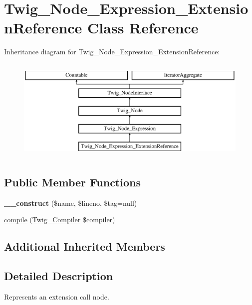 \hypertarget{class_twig___node___expression___extension_reference}{}\section{Twig\+\_\+\+Node\+\_\+\+Expression\+\_\+\+Extension\+Reference Class Reference}
\label{class_twig___node___expression___extension_reference}
Inheritance diagram for Twig\+\_\+\+Node\+\_\+\+Expression\+\_\+\+Extension\+Reference\+:\begin{figure}[H]
\begin{center}
\leavevmode
\includegraphics[height=5.000000cm]{class_twig___node___expression___extension_reference}
\end{center}
\end{figure}
\subsection*{Public Member Functions}
\begin{DoxyCompactItemize}
\item 
\hypertarget{class_twig___node___expression___extension_reference_a0028166bd229cdc2e0c0a79c4f3069fa}{}{\bfseries \+\_\+\+\_\+construct} (\$name, \$lineno, \$tag=null)\label{class_twig___node___expression___extension_reference_a0028166bd229cdc2e0c0a79c4f3069fa}

\item 
\hyperlink{class_twig___node___expression___extension_reference_a4e0faa87c3fae583620b84d3607085da}{compile} (\hyperlink{class_twig___compiler}{Twig\+\_\+\+Compiler} \$compiler)
\end{DoxyCompactItemize}
\subsection*{Additional Inherited Members}


\subsection{Detailed Description}
Represents an extension call node.

